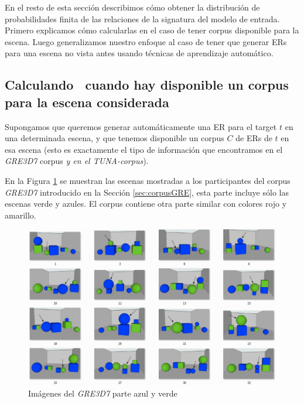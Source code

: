 En el resto de esta secci\'on describimos c\'omo obtener la distribuci\'on de probabilidades finita de las relaciones de la signatura del modelo de entrada. Primero explicamos c\'omo calcularlas en el caso de tener corpus disponible para la escena. Luego generalizamos nuestro enfoque al caso de tener que generar ERs para una escena no vista antes usando t\'ecnicas de aprendizaje autom\'atico.  


\subsection{Calculando \puse\ cuando hay disponible un corpus para la escena considerada}

Supongamos que queremos generar autom\'aticamente una ER para el target $t$ en una
determinada escena, y que tenemos disponible un corpus $C$ de ERs de $t$
en esa escena (esto es exactamente el tipo de informaci\'on que encontramos en el
\textit{GRE3D7} corpus \textit{y en el TUNA-corpus}).

En la Figura \ref{verde-azul} se muestran las escenas mostradas a los participantes del corpus \textit{GRE3D7} introducido en la Secci\'on \ref{sec:corpusGRE}, esta parte incluye s\'olo las escenas verde y azules. El corpus contiene otra parte similar con colores rojo y amarillo.

\begin{figure}[H]
\centering
\includegraphics[width=1\textwidth]{images/corpusVerdeAzul.png}
\caption{Im\'agenes del \textit{GRE3D7} parte azul y verde}
\label{verde-azul}
\end{figure}

